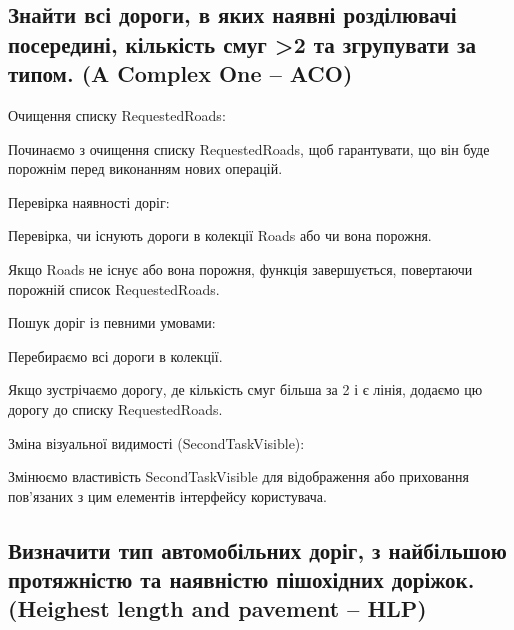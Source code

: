 \documentclass[14pt]{extarticle}
\begin{document}
\subsection{Знайти всі дороги, в яких наявні розділювачі посередині, кількість смуг >2 та згрупувати за типом. (A Complex One -- ACO)}


\begin{thirdList}
\item Очищення списку RequestedRoads:
\begin{thirdList}
\item Починаємо з очищення списку RequestedRoads, щоб гарантувати, що він буде порожнім перед виконанням нових операцій.
\end{thirdList}

\item Перевірка наявності доріг:
\begin{thirdList}
\item Перевірка, чи існують дороги в колекції Roads або чи вона порожня.
\item Якщо Roads не існує або вона порожня, функція завершується, повертаючи порожній список RequestedRoads.
\end{thirdList}

\item Пошук доріг із певними умовами:
\begin{thirdList}
\item Перебираємо всі дороги в колекції.
\item Якщо зустрічаємо дорогу, де кількість смуг більша за 2 і є лінія, додаємо цю дорогу до списку RequestedRoads.
\end{thirdList}

\item Зміна візуальної видимості (SecondTaskVisible):
\begin{thirdList}
\item Змінюємо властивість SecondTaskVisible для відображення або приховання пов'язаних з цим елементів інтерфейсу користувача.
\end{thirdList}

\end{thirdList}
\subsection{Визначити тип автомобільних доріг, з найбільшою протяжністю та наявністю пішохідних доріжок. (Heighest length and pavement -- HLP)}
\end{document}
